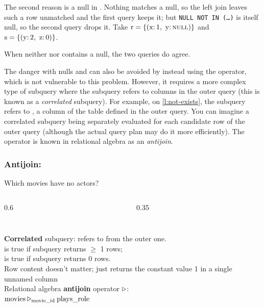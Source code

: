 {\begin{enumerate}
            The second reason is a null in .
            Nothing matches a null, so the left join leaves such a row unmatched and the first query keeps it; but \texttt{NULL NOT IN (\dots)} is itself null, so the second query drops it.
            Take $\ra{r} = \{(\ra{x}{:}\,1,\ \ra{y}{:}\,\textsc{null})\}$ and $\ra{s} = \{(\ra{y}{:}\,2,\ \ra{z}{:}\,0)\}$.

            When neither  nor  contains a null, the two queries do agree.
    \end{enumerate}
}

The danger with nulls and  can also be avoided by instead using the  operator, which is not vulnerable to this problem.
However, it requires a more complex type of subquery where the subquery refers to columns in the outer query (this is known as a \emph{correlated} subquery).
For example, on \autoref{l:not-exists}, the subquery refers to , a column of the table  defined in the outer query.
You can imagine a correlated subquery being separately evaluated for each candidate row of the outer query (although the actual query plan may do it more efficiently).
The  operator is known in relational algebra as an \emph{antijoin}.

\begin{frame}
    \label{s:not-exists}
    \frametitle{Antijoin: }
    Which movies have no actors?
    \begin{columns}[onlytextwidth]
        \begin{column}{0.6\textwidth}
            \inputminted[fontsize=\footnotesize]{sql}{code/sql-not-exists.sql}
        \end{column}
        \begin{column}{0.35\textwidth}
            {\footnotesize}
        \end{column}
    \end{columns}
    \vspace{0.8em}
    \textbf{Correlated} subquery: refers to  from the outer one.\\[0.5em]
     is true if subquery returns $\ge$ 1 rows;\\
     is true if subquery returns 0 rows.\\[0.8em]\pause
    Row content doesn't matter;  just returns the constant value 1 in a single unnamed column\\[0.8em]
    Relational algebra \textbf{antijoin} operator $\rabin{\triangleright}$:\\[0.3em]
    \hspace*{1em}$\ra{movies} \rabin{\triangleright}_{\ra{movie\_id}} \ra{plays\_role}$
\end{frame}
\label{l:not-exists}

